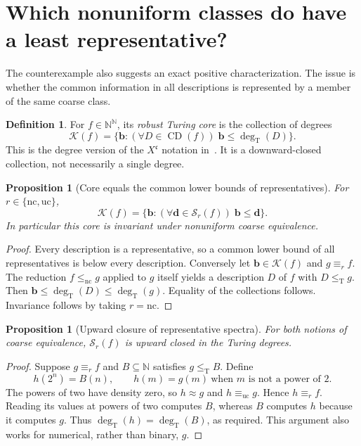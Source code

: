 \documentclass[11pt,a4paper]{article}
\newcommand{\N}{\mathbb N}
\newcommand{\Baire}{\N^{\N}}
\newcommand{\leT}{\leq_{\mathrm T}}
\newcommand{\degT}{\operatorname{deg}_{\mathrm T}}
\newcommand{\CD}{\operatorname{CD}}
\newcommand{\nc}{\mathrm{nc}}
\newcommand{\uc}{\mathrm{uc}}
\newcommand{\Spec}{\mathcal S}
\newcommand{\Core}{\mathcal K}
\newtheorem{proposition}[theorem]{Proposition}
\theoremstyle{definition}
\newtheorem{definition}[theorem]{Definition}
\theoremstyle{remark}
\begin{document}
\section{Which nonuniform classes do have a least representative?}
\label{sec:classification}
The counterexample also suggests an exact positive characterization.
The issue is whether the common information in all descriptions is
represented by a member of the same coarse class.

\begin{definition}
For $f\in\Baire$, its \emph{robust Turing core} is the collection of
degrees
\[
 \Core(f)=\{\mathbf b:(\forall D\in\CD(f))\;\mathbf b\le\degT(D)\}.
\]
This is the degree version of the $X^{\mathfrak c}$ notation in~\cite{HJKS}.
It is a downward-closed collection, not necessarily a single degree.
\end{definition}

\begin{proposition}[Core equals the common lower bounds of representatives]
\label{prop:core}
For $r\in\{\nc,\uc\}$,
\[
 \Core(f)=\{\mathbf b:(\forall\mathbf d\in\Spec_r(f))\;\mathbf b\le\mathbf d\}.
\]
In particular this core is invariant under nonuniform coarse equivalence.
\end{proposition}
\begin{proof}
Every description is a representative, so a common lower bound of all
representatives is below every description. Conversely let
$\mathbf b\in\Core(f)$ and $g\equiv_r f$. The reduction $f\le_{\nc}g$
applied to $g$ itself yields a description $D$ of $f$ with $D\leT g$.
Then $\mathbf b\le\degT(D)\le\degT(g)$. Equality of the collections
follows. Invariance follows by taking $r=\nc$.
\end{proof}

\begin{proposition}[Upward closure of representative spectra]
\label{prop:upward}
For both notions of coarse equivalence, $\Spec_r(f)$ is upward closed in
the Turing degrees.
\end{proposition}
\begin{proof}
Suppose $g\equiv_r f$ and $B\subseteq\N$ satisfies $g\leT B$. Define
\[
 h(2^n)=B(n),\qquad h(m)=g(m)\ \text{when }m\text{ is not a power of }2.
\]
The powers of two have density zero, so $h\approx g$ and
$h\equiv_{\uc}g$. Hence $h\equiv_r f$. Reading its values at powers of
two computes $B$, whereas $B$ computes $h$ because it computes $g$.
Thus $\degT(h)=\degT(B)$, as required. This argument also works for
numerical, rather than binary, $g$.
\end{proof}
\end{document}

